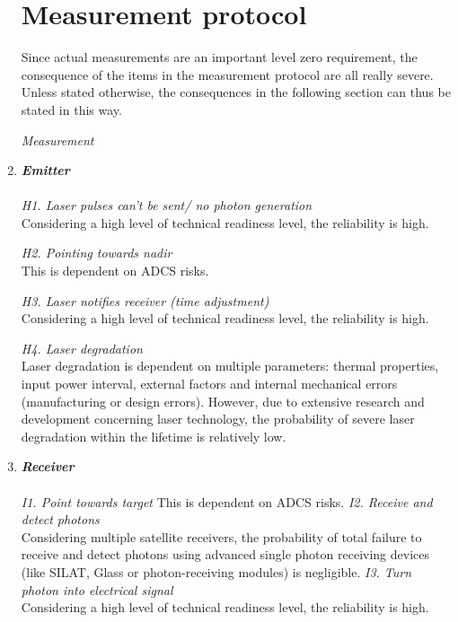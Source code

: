 \begin{enumerate}[A]
\section{Measurement protocol}
\label{blTRAMp}
Since actual measurements are an important level zero requirement, the consequence of the items in the measurement protocol are all really severe. Unless stated otherwise, the consequences in the following section can thus be stated in this way.

\begin{description}
\item[\textit{Measurement}]
\end{description}
	\item\textbf{\textit{Emitter}} \\\\
\textit{H1. Laser pulses can't be sent/ no photon generation}\\ Considering a high level of technical readiness level, the reliability is high.

\textit{H2. Pointing towards nadir}\\
This is dependent on ADCS risks.

\textit{H3. Laser notifies receiver (time adjustment)}\\ 
Considering a high level of technical readiness level, the reliability is high.

\textit{H4. Laser degradation}\\
Laser degradation is dependent on multiple parameters: thermal properties, input power interval, external factors and internal mechanical errors (manufacturing or design errors). However, due to extensive research and development concerning laser technology, the probability of severe laser degradation within the lifetime is relatively low. 

	\item\textbf{\textit{Receiver}} \\\\
\textit{I1. Point towards target} 
This is dependent on ADCS risks.
\textit{I2. Receive and detect photons}\\ 
Considering multiple satellite receivers, the probability of total failure to receive and detect photons using advanced single photon receiving devices (like SILAT, Glass or photon-receiving modules) is negligible. 
\textit{I3. Turn photon into electrical signal}\\ 
Considering a high level of technical readiness level, the reliability is high.


\end{enumerate}
